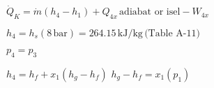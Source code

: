 \( \dot{Q}_{K} = \dot{m} (h_4 - h_1) + Q_{4x} \, \text{adiabat or isel} - W_{4x} \)  

\( h_4 = h_s(8 \, \text{bar}) = 264.15 \, \text{kJ/kg} \, \text{(Table A-11)} \)  

\( p_4 = p_3 \)  

\( h_4 = h_f + x_1 (h_g - h_f) \)  
\( h_g - h_f = x_1 (p_1) \)